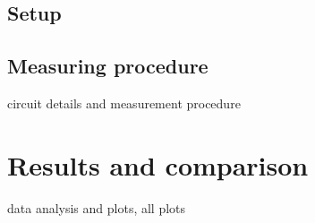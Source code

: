 


\subsection{Setup} 
\subsection{Measuring procedure} 

circuit details and measurement procedure


\section{Results and comparison} %
\label{sec:future_projection}

data analysis and plots, all plots 


